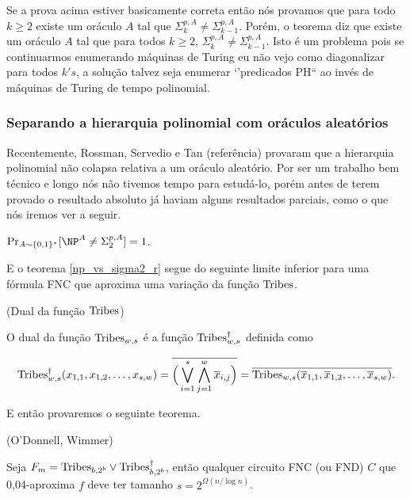 \color{red}

Se a prova acima estiver basicamente correta então nós provamos que para todo $k \geq 2$ existe um oráculo $A$ tal que $\Sigma_{k}^{p, A} \neq \Sigma_{k - 1}^{p, A}$. Porém, o teorema diz que existe um oráculo $A$ tal que para todos $k \geq 2$, $\Sigma_{k}^{p, A} \neq \Sigma_{k - 1}^{p, A}$. Isto é um problema pois se continuarmos enumerando máquinas de Turing eu não vejo como diagonalizar para todos $k's$, a solução talvez seja enumerar `'predicados PH`` ao invés de máquinas de Turing de tempo polinomial.

\color{black}

\subsubsection{Separando a hierarquia polinomial com oráculos aleatórios}

Recentemente, Rossman, Servedio e Tan (referência) provaram que a hierarquia polinomial não colapsa relativa a um oráculo aleatório. Por ser um trabalho bem técnico e longo nós não tivemos tempo para estudá-lo, porém antes de terem provado o resultado absoluto já haviam alguns resultados parciais, como o que nós iremos ver a seguir.

\begin{teo} \label{np_vs_sigma2_r}
	$\Pr_{A \sim \binalph^{*}}[\NP^{A} \neq \Sigma_{2}^{p, A}] = 1$.
\end{teo}

E o teorema \ref{np_vs_sigma2_r} segue do seguinte limite inferior para uma fórmula FNC que aproxima uma variação da função $\text{Tribes}$.

\begin{defi} (Dual da função $\text{Tribes}$)

O dual da função $\text{Tribes}_{w, s}$ é a função $\text{Tribes}_{w, s}^{\dagger}$ definida como

\begin{equation*}
	\text{Tribes}_{w, s}^{\dagger}(x_{1, 1}, x_{1,2}, \dots, x_{s, w})  = \overline{\Big(\bigvee_{i = 1}^{s}\bigwedge_{j = 1}^{w} \overline{x}_{i, j}\Big)} = \overline{\text{Tribes}_{w, s}(\overline{x}_{1, 1}, \overline{x}_{1, 2}, \dots, \overline{x}_{s, w})}.
\end{equation*}

\end{defi}

E então provaremos o seguinte teorema.

\begin{teo} (O'Donnell, Wimmer) \label{odonnell_wimmer}

Seja $F_{m} = \text{Tribes}_{b, 2^{b}} \lor \text{Tribes}_{b, 2^{b}}^{\dagger}$, então qualquer circuito FNC (ou FND) $C$ que  0,04-aproxima $f$ deve ter tamanho $s = 2^{\Omega(n/\log n)}$.

\end{teo}

